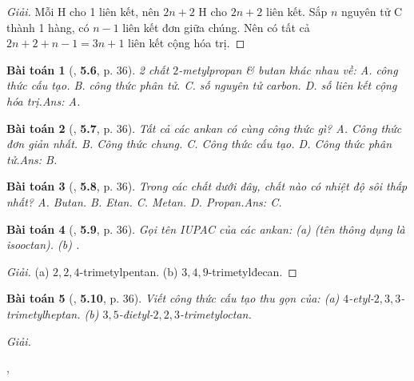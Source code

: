 \documentclass{article}
\numberwithin{equation}{section}
\newtheorem{baitoan}{Bài toán}[section]
\begin{document}
\begin{proof}[Giải]
	Mỗi H cho 1 liên kết, nên $2n + 2$ H cho $2n + 2$ liên kết. Sắp $n$ nguyên tử C thành 1 hàng, có $n - 1$ liên kết đơn giữa chúng. Nên có tất cả $2n + 2 + n - 1 = 3n + 1$ liên kết cộng hóa trị.
\end{proof}

\begin{baitoan}[\cite{SBT_Hoa_Hoc_11_co_ban}, \textbf{5.6}, p. 36]
	2 chất $2$-metylpropan \& butan khác nhau về: {\sf A.} công thức cấu tạo. {\sf B.} công thức phân tử. {\sf C.} số nguyên tử carbon. {\sf D.} số liên kết cộng hóa trị.\hfill{\sf Ans: A.}
\end{baitoan}

\begin{baitoan}[\cite{SBT_Hoa_Hoc_11_co_ban}, \textbf{5.7}, p. 36]
	Tất cả các ankan có cùng công thức gì? {\sf A.} Công thức đơn giản nhất. {\sf B.} Công thức chung. {\sf C.} Công thức cấu tạo. {\sf D.} Công thức phân tử.\hfill{\sf Ans: B.}
\end{baitoan}

\begin{baitoan}[\cite{SBT_Hoa_Hoc_11_co_ban}, \textbf{5.8}, p. 36]
	Trong các chất dưới đây, chất nào có nhiệt độ sôi thấp nhất? {\sf A.} Butan. {\sf B.} Etan. {\sf C.} Metan. {\sf D.} Propan.\hfill{\sf Ans: C.}
\end{baitoan}

\begin{baitoan}[\cite{SBT_Hoa_Hoc_11_co_ban}, \textbf{5.9}, p. 36]
	Gọi tên IUPAC của các ankan: (a) \emph{} (tên thông dụng là \emph{isooctan}). (b) \emph{}.
\end{baitoan}

\begin{proof}[Giải]
	(a) $2,2,4$-trimetylpentan. (b) $3,4,9$-trimetylđecan.
\end{proof}

\begin{baitoan}[\cite{SBT_Hoa_Hoc_11_co_ban}, \textbf{5.10}, p. 36]
	Viết công thức cấu tạo thu gọn của: (a) $4$-etyl-$2,3,3$-trimetylheptan. (b) $3,5$-đietyl-$2,2,3$-trimetyloctan.
\end{baitoan}
\noindent\textit{Giải.}
\begin{center}
	,\hspace{1cm}
\end{center}
\end{document}
